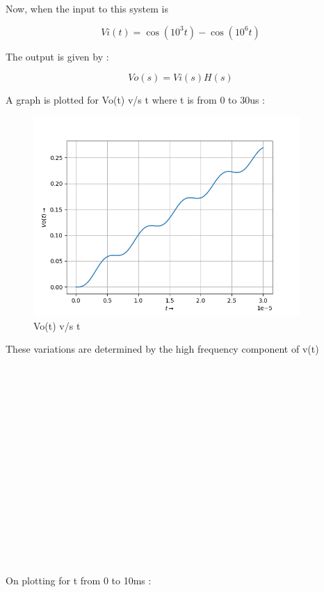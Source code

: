 \documentclass[10pt,a4paper]{article}
\begin{document}
Now, when the input to this system is 

\[Vi(t) = \cos{(10^3t)}-\cos{(10^6t)} \]

The output is given by : 
 
\[ Vo(s) = Vi(s)H(s) \]

A graph is plotted for Vo(t) v/s t where t is from 0 to 30us : 

\begin{figure}[!tbh]

\includegraphics[width = 0.9\textwidth]{6.png}
\caption{Vo(t) v/s t}

\end{figure}

These variations are determined by the high frequency component of v(t)\\ \\ \\ \\ \\ \\ \\ \\ \\ \\ \\ \\  \\ \\ \\ \\ \\
 
On plotting for t from 0 to 10ms : 
\end{document}
